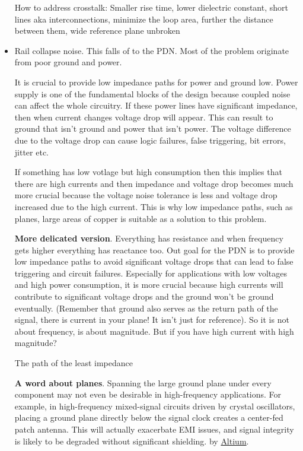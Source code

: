 \documentclass[12pt]{article}
\begin{document}
\begin{itemize}
	How to address crosstalk: Smaller rise time, lower dielectric constant, short lines aka interconnections, minimize the loop area, further the distance between them, wide reference plane unbroken

	\item Rail collapse noise. This falls of to the PDN. Most of the problem originate from poor ground and power.

	It is crucial to provide low impedance paths for power and ground low. Power supply is one of the fundamental blocks of the design because coupled noise can affect the whole circuitry. If these power lines have significant impedance, then when current changes voltage drop will appear. This can result to ground that isn't ground and power that isn't power. The voltage difference due to the voltage drop can cause logic failures, false triggering, bit errors, jitter etc. 
	
	If something has low votlage but high consumption then this implies that there are high currents and then impedance and voltage drop becomes much more crucial because the voltage noise tolerance is less and voltage drop increased due to the high current. This is why low impedance paths, such as planes, large areas of copper is suitable as a solution to this problem.
	
	\textbf{More delicated version}. Everything has resistance and when frequency gets higher everything has reactance too. Out goal for the PDN is to provide low impedance paths to avoid significant voltage drops that can lead to false triggering and circuit failures. Especially for applications with low voltages and high power consumption, it is more crucial because high currents will contribute to significant voltage drops and the ground won't be ground eventually. (Remember that ground also serves as the return path of the signal, there is current in your plane! It isn't just for reference). So it is not about frequency, is about magnitude. But if you have high current with high magnitude?
	
	The path of the least impedance
	
	\textbf{A word about planes}. Spanning the large ground plane under every component may not even be desirable in high-frequency applications. For example, in high-frequency mixed-signal circuits driven by crystal oscillators, placing a ground plane directly below the signal clock creates a center-fed patch antenna. This will actually exacerbate EMI issues, and signal integrity is likely to be degraded without significant shielding. by \href{https://resources.altium.com/p/preventing-ground-loops-your-pcb-design}{Altium}. 
	

\end{itemize}
\end{document}
